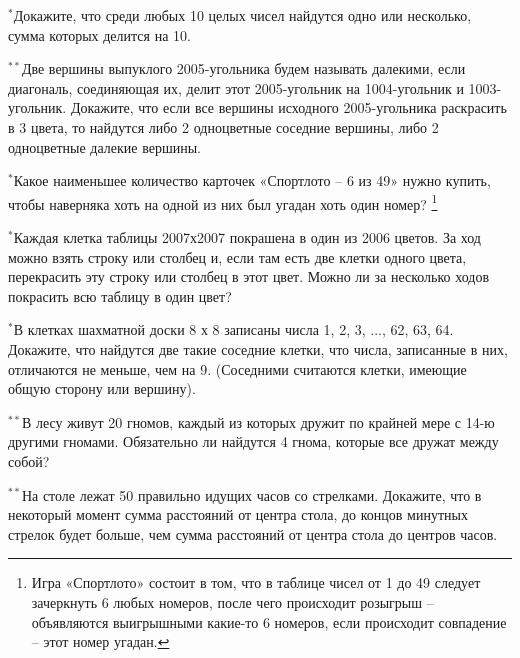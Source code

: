 \begin{thm}
	$^{\ast}$Докажите, что среди любых 10 целых чисел найдутся одно или несколько, сумма которых делится на 10.
\end{thm}

\begin{thm}
	$^{\ast\ast}$Две вершины выпуклого 2005-угольника будем называть далекими, если диагональ, соединяющая их, делит этот 2005-угольник на 1004-угольник и 1003-угольник. Докажите, что если все вершины исходного 2005-угольника раскрасить в 3 цвета, то найдутся либо 2 одноцветные соседние вершины, либо 2 одноцветные далекие вершины.
\end{thm}

\begin{thm}
	$^{\ast}$Какое наименьшее количество карточек «Спортлото – 6 из 49» нужно купить, чтобы наверняка хоть на одной из них был угадан хоть один номер? \footnote{Игра «Спортлото» состоит в том, что в таблице чисел от 1 до 49 следует зачеркнуть 6 любых номеров, после чего происходит розыгрыш – объявляются выигрышными какие-то 6 номеров, если происходит совпадение – этот номер угадан.}
\end{thm}

\begin{thm}
	$^{\ast}$Каждая клетка таблицы 2007х2007 покрашена в один из 2006 цветов. За ход можно взять строку или столбец и, если там есть две клетки одного цвета, перекрасить эту строку или столбец в этот цвет. Можно ли за несколько ходов покрасить всю таблицу в один цвет?
\end{thm}

\begin{thm}
	$^{\ast}$В клетках шахматной доски 8 х 8 записаны числа 1, 2, 3, ..., 62, 63, 64. Докажите, что найдутся две такие соседние клетки, что числа, записанные в них, отличаются не меньше, чем на 9. (Соседними считаются клетки, имеющие общую сторону или вершину).
\end{thm}

\begin{thm}
	$^{\ast\ast}$В лесу живут 20 гномов, каждый из которых дружит по крайней мере с 14-ю другими гномами. Обязательно ли найдутся 4 гнома, которые все дружат между собой?
\end{thm}

\begin{thm}
	$^{\ast\ast}$На столе лежат 50 правильно идущих часов со стрелками. Докажите, что в некоторый момент сумма расстояний от центра стола, до концов минутных стрелок будет больше, чем сумма расстояний от центра стола до центров часов.
\end{thm}

